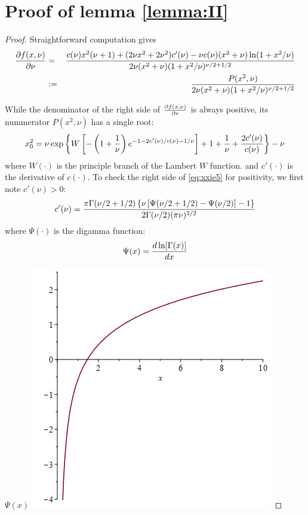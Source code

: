 \documentclass{article}
\begin{document}
\section{Proof of lemma \ref{lemma:II}}
\begin{proof}
  Straightforward computation gives
  \begin{eqnarray}
    \frac{\partial f(x, \nu)}{\partial \nu} &=& {
      c(\nu) x^2 (\nu + 1) + (2 \nu x^2 + 2 \nu^2) c'(\nu)
      -
      \nu c(\nu) (x^2 + \nu) \ln(1 + x^2/\nu)
      \over
      2 \nu (x^2 + \nu) (1 + x^2 / \nu)^{\nu/2 + 1/2}
    } \nonumber \\
    &:=& {
      P(x^2, \nu)
      \over
      2 \nu (x^2 + \nu) (1 + x^2 / \nu)^{\nu/2 + 1/2}
    }
    \label{eq:xxie4.1}
  \end{eqnarray}

  While the denominator of the right side of $\frac{\partial f(x, \nu)}{\partial \nu}$ is
  always positive, its nummerator $P(x^2, \nu)$ has a single root:
  \begin{equation}
    \label{eq:xxie5}
    x_0^2 = \nu\exp\left\{
      W\left[
        -\left(1 + {1 \over \nu}\right)
        e^{-1 - 2 c'(\nu)/c(\nu) - 1/\nu}
      \right]
      + 1 + {1 \over \nu} + {2 c'(\nu) \over c(\nu)}
    \right\} - \nu
  \end{equation}
  where $W(\cdot)$ is the principle branch of the Lambert $W$
  function. and $c'(\cdot)$ is the derivative of $c(\cdot)$. To check
  the right side of \eqref{eq:xxie5} for positivity, we first note
  $c'(\nu) > 0$:
  \[
  c'(\nu) = {
    \pi \Gamma(\nu/2 + 1/2) \left\{
      \nu \left[ \Psi(\nu/2 + 1/2) - \Psi(\nu/2)\right] - 1
    \right\}
    \over
    2 \Gamma(\nu/2) (\pi \nu)^{3/2}
  }
  \]
  where $\Psi(\cdot)$ is the digamma function:
  \[
  \Psi(x) = \frac{d \ln[\Gamma(x)]}{d x}
  \]
  \begin{minipage}{0.48\textwidth}
    $\Psi(x)$ \linebreak
    \includegraphics[width=\textwidth]{digamma.png}

\end{minipage}
\end{proof}
\end{document}
